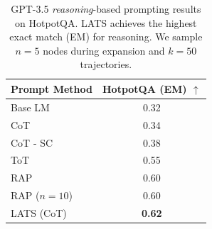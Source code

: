 \begin{table}[t]
    \centering
    \begin{tabular}{l|c}
    \toprule
        \textbf{Prompt Method} & \textbf{HotpotQA (EM) $\uparrow$} \\
    \midrule
        Base LM & 0.32 \\
        CoT {\scriptsize~\citep{wei2022chain}} & 0.34 \\ 
        CoT - SC {\scriptsize~\citep{wang2022self}} & 0.38 \\
        ToT {\scriptsize~\citep{yao2023tree}} & 0.55 \\
        RAP {\scriptsize~\citep{hao2023reasoning}} & 0.60 \\
        RAP ($n = 10$) & 0.60 \\
        LATS (CoT) & \textbf{0.62} \\
    \bottomrule
    \end{tabular}
    \caption{GPT-3.5 \emph{reasoning}-based prompting results on HotpotQA. LATS achieves the highest exact match (EM) for reasoning. We sample $n=5$ nodes during expansion and $k = 50$ trajectories.}
    \label{table:hotpot-cot}
\end{table}


